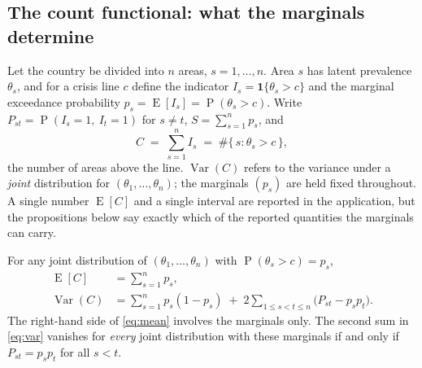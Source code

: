%

\subsection{The count functional: what the marginals determine}

Let the country be divided into $n$ areas, $s=1,\dots,n$.  Area $s$ has latent
prevalence $\theta_s$, and for a crisis line $c$ define the indicator
$I_s = \mathbf{1}\{\theta_s > c\}$ and the marginal exceedance probability
$p_s = \operatorname{E}[I_s] = \operatorname{P}(\theta_s > c)$.  Write
$P_{st} = \operatorname{P}(I_s = 1,\ I_t = 1)$ for $s \neq t$,
$S = \sum_{s=1}^{n} p_s$, and
\begin{equation}
  C \;=\; \sum_{s=1}^{n} I_s \;=\; \#\{\, s : \theta_s > c \,\},
  \label{eq:count}
\end{equation}
the number of areas above the line.  $\operatorname{Var}(C)$ refers to the
variance under a \emph{joint} distribution for $(\theta_1,\dots,\theta_n)$;
the marginals $(p_s)$ are held fixed throughout.  A single number
$\operatorname{E}[C]$ and a single interval are reported in the application,
but the propositions below say exactly which of the reported quantities the
marginals can carry.

\begin{proposition}
\label{prop:meanvar}
For any joint distribution of $(\theta_1,\dots,\theta_n)$ with
$\operatorname{P}(\theta_s > c) = p_s$,
\begin{align}
  \operatorname{E}[C] &= \sum_{s=1}^{n} p_s, \label{eq:mean}\\
  \operatorname{Var}(C) &= \sum_{s=1}^{n} p_s(1-p_s)
     \;+\; 2\sum_{1 \le s < t \le n}\bigl(P_{st} - p_s p_t\bigr). \label{eq:var}
\end{align}
The right-hand side of \eqref{eq:mean} involves the marginals only.  The second
sum in \eqref{eq:var} vanishes for \emph{every} joint distribution with these
marginals if and only if $P_{st} = p_s p_t$ for all $s<t$.
\end{proposition}

